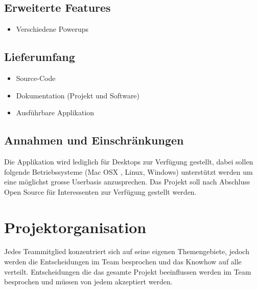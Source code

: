 \documentclass[11pt]{scrartcl}
\begin{document}
\subsection{Erweiterte Features}
\label{sec:Erweiterte Features}
\begin{itemize}
    \item Verschiedene Powerups
\end{itemize}

\subsection{Lieferumfang}
\label{sec:Lieferumfang}
\begin{itemize}
    \item Source-Code
    \item Dokumentation (Projekt und Software)
    \item Ausführbare Applikation
\end{itemize}

\subsection{Annahmen und Einschränkungen}
\label{sec:Annahmen und Einschränkungen}
Die Applikation wird lediglich für Desktops zur Verfügung gestellt, dabei sollen folgende Betriebssysteme (Mac OSX , Linux, Windows) unterstützt werden um eine möglichst grosse Userbasis anzusprechen.
Das Projekt soll nach Abschluss Open Source für Interessenten zur Verfügung gestellt werden.

\section{Projektorganisation}
\label{sec:Projektorganisation}
Jedes Teammitglied konzentriert sich auf seine eigenen Themengebiete, jedoch werden die Entscheidungen im Team besprochen und das Knowhow auf alle verteilt. Entscheidungen die das gesamte Projekt beeinflussen werden im Team besprochen und müssen von jedem akzeptiert werden.
\end{document}
